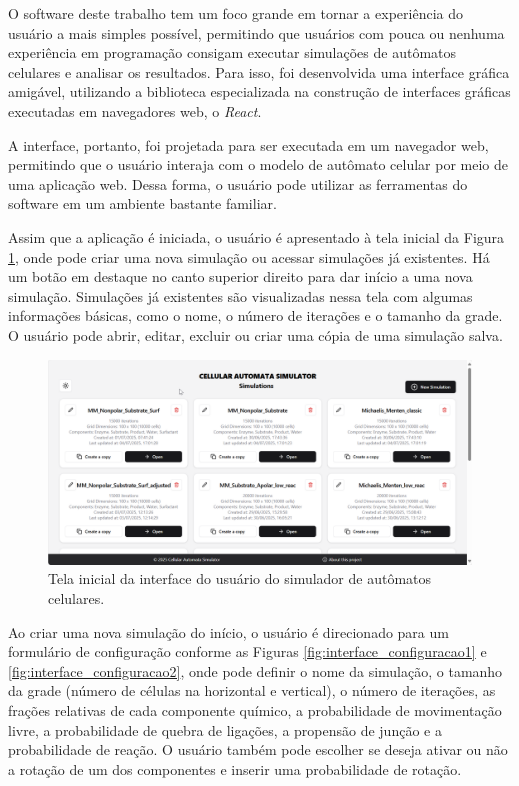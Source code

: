 \documentclass[12pt,oneside]{report}
\begin{document}
O software deste trabalho tem um foco grande em tornar a experiência do usuário a mais simples possível, permitindo que usuários com pouca ou nenhuma experiência em programação consigam executar simulações de autômatos celulares e analisar os resultados. Para isso, foi desenvolvida uma interface gráfica amigável, utilizando a biblioteca especializada na construção de interfaces gráficas executadas em navegadores web, o \textit{React}.

A interface, portanto, foi projetada para ser executada em um navegador web, permitindo que o usuário interaja com o modelo de autômato celular por meio de uma aplicação web. Dessa forma, o usuário pode utilizar as ferramentas do software em um ambiente bastante familiar.

Assim que a aplicação é iniciada, o usuário é apresentado à tela inicial da Figura \ref{fig:interface_inicial}, onde pode criar uma nova simulação ou acessar simulações já existentes. Há um botão em destaque no canto superior direito para dar início a uma nova simulação. Simulações já existentes são visualizadas nessa tela com algumas informações básicas, como o nome, o número de iterações e o tamanho da grade. O usuário pode abrir, editar, excluir ou criar uma cópia de uma simulação salva.

\begin{figure}[H]
    \centering
    \includegraphics[width=1\textwidth]{interface_inicial.png}
    \caption{\small Tela inicial da interface do usuário do simulador de autômatos celulares.}
    \label{fig:interface_inicial}
\end{figure}

Ao criar uma nova simulação do início, o usuário é direcionado para um formulário de configuração conforme as Figuras \ref{fig:interface_configuracao1} e \ref{fig:interface_configuracao2}, onde pode definir o nome da simulação, o tamanho da grade (número de células na horizontal e vertical), o número de iterações, as frações relativas de cada componente químico, a probabilidade de movimentação livre, a probabilidade de quebra de ligações, a propensão de junção e a probabilidade de reação. O usuário também pode escolher se deseja ativar ou não a rotação de um dos componentes e inserir uma probabilidade de rotação.
\end{document}
